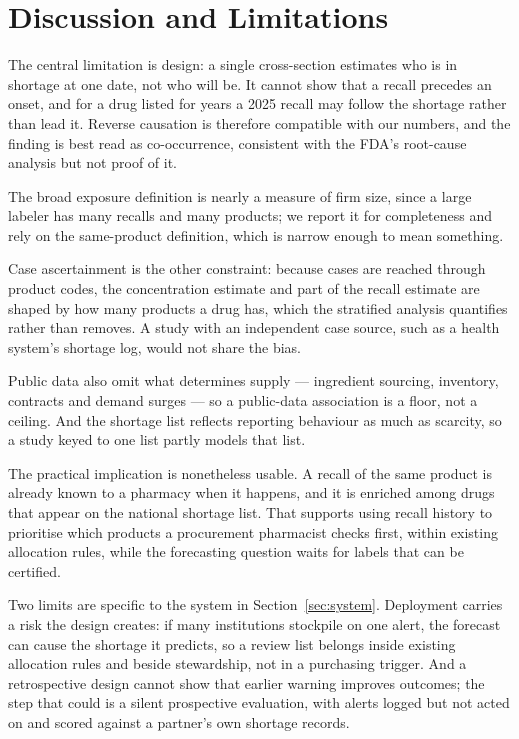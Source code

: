 \documentclass[conference,letterpaper]{IEEEtran}
\begin{document}
\section{Discussion and Limitations}\label{sec:disc}

The central limitation is design: a single cross-section estimates who is in
shortage at one date, not who will be. It cannot show that a recall precedes an
onset, and for a drug listed for years a 2025 recall may follow the shortage
rather than lead it. Reverse causation is therefore compatible with our numbers,
and the finding is best read as co-occurrence, consistent with the FDA's
root-cause analysis \cite{fdataskforce} but not proof of it.

The broad exposure definition is nearly a measure of firm size, since a large
labeler has many recalls and many products; we report it for completeness and
rely on the same-product definition, which is narrow enough to mean something.

Case ascertainment is the other constraint: because cases are reached through
product codes, the concentration estimate and part of the recall estimate are
shaped by how many products a drug has, which the stratified analysis quantifies
rather than removes. A study with an independent case source, such as a health
system's shortage log, would not share the bias.

Public data also omit what determines supply --- ingredient sourcing, inventory,
contracts and demand surges --- so a public-data association is a floor, not a
ceiling. And the shortage list reflects reporting behaviour as much as scarcity,
so a study keyed to one list partly models that list.

The practical implication is nonetheless usable. A recall of the same product is
already known to a pharmacy when it happens, and it is enriched among drugs that
appear on the national shortage list. That supports using recall history to
prioritise which products a procurement pharmacist checks first, within existing
allocation rules, while the forecasting question waits for labels that can be
certified.

Two limits are specific to the system in Section~\ref{sec:system}. Deployment
carries a risk the design creates: if many institutions stockpile on one alert,
the forecast can cause the shortage it predicts, so a review list belongs inside
existing allocation rules and beside stewardship, not in a purchasing trigger.
And a retrospective design cannot show that earlier warning improves outcomes;
the step that could is a silent prospective evaluation, with alerts logged but
not acted on and scored against a partner's own shortage records.
\end{document}
